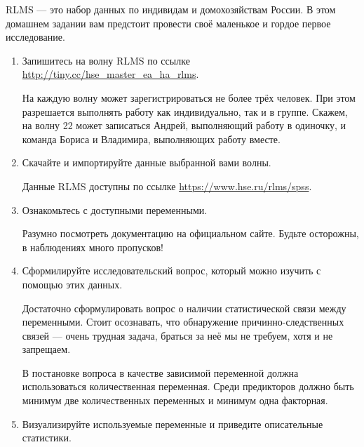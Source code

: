 \documentclass[12pt]{article}
\begin{document}
RLMS — это набор данных по индивидам и домохозяйствам России. В этом домашнем задании вам предстоит провести своё маленькое и гордое первое исследование. 



\begin{enumerate}

\item Запишитесь на волну RLMS по ссылке
\url{http://tiny.cc/hse_master_ea_ha_rlms}.


На каждую волну может зарегистрироваться не более трёх человек. При этом разрешается выполнять работу как индивидуально, так и в группе. Скажем, на волну 22 может записаться Андрей, выполняющий работу в одиночку, и команда Бориса и Владимира, выполняющих работу вместе. 

\item Скачайте и импортируйте данные выбранной вами волны.

Данные RLMS доступны по ссылке \url{https://www.hse.ru/rlms/spss}.


\item Ознакомьтесь с доступными переменными. 

Разумно посмотреть документацию на официальном сайте.
Будьте осторожны, в наблюдениях много пропусков!

\item Сформилируйте исследовательский вопрос, который можно изучить с помощью этих данных.

Достаточно сформулировать вопрос о наличии статистической связи между переменными. Стоит осознавать, что обнаружение причинно-следственных связей — очень трудная задача, браться за неё мы не требуем, хотя и не запрещаем.

В постановке вопроса в качестве зависимой переменной должна использоваться количественная переменная. Среди предикторов должно быть минимум две количественных переменных и минимум одна факторная.


\item Визуализируйте используемые переменные и приведите описательные статистики.


\end{enumerate}
\end{document}
